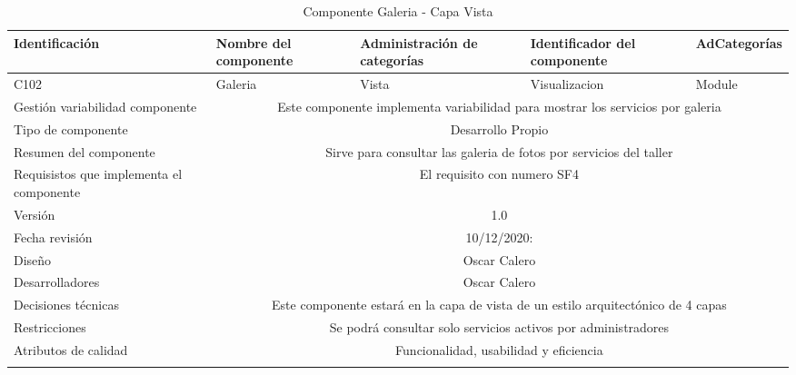 \documentclass[10pt,a4paper,openany]{book}
\begin{document}
\begin{longtable}{|p{3cm}|p{3cm}|p{3cm}|p{3cm}|p{3cm}|} \hline
Identificación & Nombre del componente & Administración de categorías & Identificador del componente & AdCategorías \\[0.5ex] \hline
C102& Galeria& Vista& Visualizacion& Module\\[0.5ex] \hline
Gestión variabilidad componente & \multicolumn{4}{|c|}{Este componente implementa variabilidad para mostrar los servicios por galeria} \\ \hline
Tipo de componente & \multicolumn{4}{|c|}{Desarrollo Propio} \\ \hline
Resumen del componente & \multicolumn{4}{|c|}{Sirve para consultar las galeria de fotos por servicios del taller} \\ \hline
Requisistos que implementa el componente & \multicolumn{4}{|c|}{El requisito con numero SF4 } \\ \hline
Versión & \multicolumn{4}{|c|}{1.0 } \\ \hline
Fecha revisión & \multicolumn{4}{|c|}{ 10/12/2020:} \\ \hline
Diseño & \multicolumn{4}{|c|}{Oscar Calero} \\ \hline
Desarrolladores & \multicolumn{4}{|c|}{Oscar Calero} \\ \hline
Decisiones técnicas & \multicolumn{4}{|c|}{Este componente estará en la capa de vista de un estilo arquitectónico de 4 capas  } \\ \hline
Restricciones & \multicolumn{4}{|c|}{Se podrá consultar solo servicios activos por administradores} \\ \hline
Atributos de calidad & \multicolumn{4}{|c|}{Funcionalidad, usabilidad y eficiencia} \\ \hline
\caption{Componente Galeria - Capa Vista}
\label{table:t6}
\end{longtable}
\end{document}
